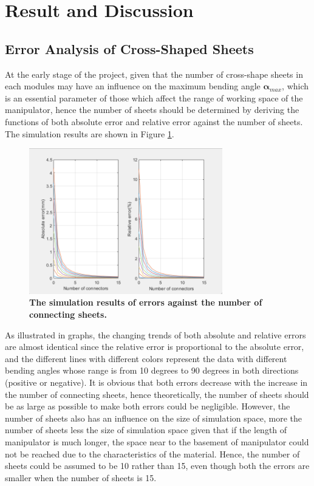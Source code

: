 \section{Result and Discussion} 
\subsection{Error Analysis of Cross-Shaped Sheets}
At the early stage of the project, given that the number of cross-shape sheets in each modules may have an 
influence on the maximum bending angle $\boldsymbol{\alpha}_{max}$, which is an essential parameter of those which 
affect the range of working space of the manipulator, hence the number of sheets should be determined by deriving 
the functions of both absolute error and relative error \cite{fishboneCR} against the number of sheets. The 
simulation results are shown in Figure \ref{fig:error_analysis}.
\begin{figure}[H] %
    \centering %
    \captionsetup{labelsep=colon}
    \includegraphics[width=0.75\textwidth]{Image/Result/error_analysis.png} 
    \caption[The simulation results of errors against the number of connecting sheets]
    {\centering \textbf{The simulation results of errors against the number of connecting sheets.}}
    \label{fig:error_analysis}
\end{figure}
As illustrated in graphs, the changing trends of both absolute and relative errors are almost identical since 
the relative error is proportional to the absolute error, and the different lines with different colors represent 
the data with different bending angles whose range is from 10 degrees to 90 degrees in both directions (positive 
or negative). It is obvious that both errors decrease with the increase in the number of connecting sheets, hence 
theoretically, the number of sheets should be as large as possible to make both errors could be negligible. However, 
the number of sheets also has an influence on the size of simulation space, more the number of sheets less the size 
of simulation space given that if the length of manipulator is much longer, the space near to the basement of 
manipulator could not be reached due to the characteristics of the material. Hence, the number of sheets could be 
assumed to be 10 rather than 15, even though both the errors are smaller when the number of sheets is 15. \\
